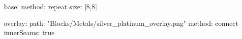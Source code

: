 base:
  method: repeat
  size: [8,8]
  
overlay:
  path: "Blocks/Metals/silver_platinum_overlay.png"
  method: connect
  innerSeams: true